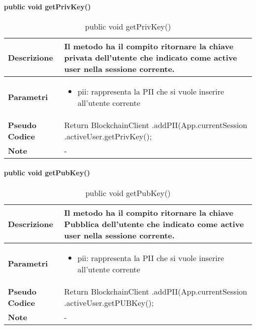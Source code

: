     \paragraph{public void getPrivKey()}
    \begin{center}
        \begin{longtable}{|p{3cm}|p{9cm}|}%
        \caption{public void getPrivKey()}
        \endfirsthead
        \endhead
        \hline
        \textbf{Descrizione} & Il metodo ha il compito ritornare la chiave privata dell’utente che indicato come active user nella sessione corrente.\\
        \hline
        \textbf{Parametri} &      
        \begin{itemize}
            \item pii: rappresenta la PII che si vuole inserire all’utente corrente
        \end{itemize}
        \\
        \hline
        \textbf{Pseudo Codice} & 
        Return BlockchainClient\newline
        .addPII(App.currentSession\newline
        .activeUser.getPrivKey();\newline
        \\
        \hline
        \textbf{Note} & 
        -
        \\
        \hline
        \end{longtable}
        \end{center}
    
\paragraph{public void getPubKey()}
\begin{center}
    \begin{longtable}{|p{3cm}|p{9cm}|}%
    \caption{public void getPubKey()}
    \endfirsthead
    \endhead
    \hline
    \textbf{Descrizione} & Il metodo ha il compito ritornare la chiave Pubblica dell’utente che indicato come active user nella sessione corrente.\\
    \hline
    \textbf{Parametri} &      
    \begin{itemize}
        \item pii: rappresenta la PII che si vuole inserire all’utente corrente
    \end{itemize}
    \\
    \hline
    \textbf{Pseudo Codice} & 
    Return BlockchainClient\newline
    .addPII(App.currentSession\newline
    .activeUser.getPUBKey();\newline
    \\
    \hline
    \textbf{Note} & 
    -
    \\
    \hline
    \end{longtable}
\end{center}

